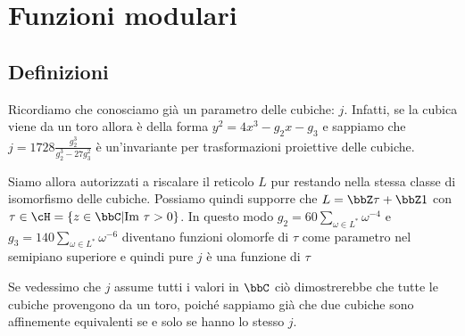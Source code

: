 \chapter{Funzioni modulari}


\section{Definizioni}


\begin{osservazione}
  Ricordiamo che conosciamo già un parametro delle cubiche:
  $j$. Infatti, se la cubica viene da un toro allora è della forma
  $y^2 = 4 x^3 - g_2 x - g_3$ e sappiamo che
  $j = 1728 \frac{g_2^3}{g_2^3 - 27 g_3^2}$ è un'invariante per
  trasformazioni proiettive delle cubiche.
\end{osservazione}

Siamo allora autorizzati a riscalare il reticolo $L$ pur restando nella
stessa classe di isomorfismo delle cubiche. Possiamo quindi supporre che
$L = \bbZ \tau + \bbZ 1$ con $\tau \in \cH = \{ z \in \bbC | \Img \tau >
0 \}$. In questo modo $g_2 = 60 \sum_{\omega \in L^*} \omega^{-4}$ e
$g_3 = 140 \sum_{\omega \in L^*} \omega^{-6}$ diventano funzioni
olomorfe di $\tau$ come parametro nel semipiano superiore e quindi pure
$j$ è una funzione di $\tau$

\begin{osservazione} \label{170123-j_suriettiva}
  Se vedessimo che $j$ assume tutti i valori in $\bbC$ ciò dimostrerebbe
  che tutte le cubiche provengono da un toro, poiché sappiamo già che
  due cubiche sono affinemente equivalenti se e solo se hanno lo stesso $j$.
\end{osservazione}

